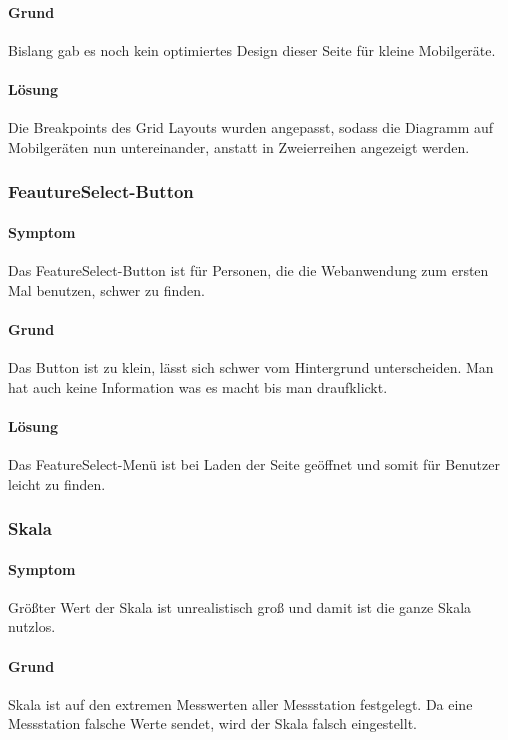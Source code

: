 \paragraph{Grund}
Bislang gab es noch kein optimiertes Design dieser Seite für kleine Mobilgeräte.

\paragraph{Lösung}
Die Breakpoints des Grid Layouts wurden angepasst, sodass die Diagramm auf Mobilgeräten nun untereinander, anstatt in Zweierreihen angezeigt werden.

\subsubsection{FeautureSelect-Button}
\paragraph{Symptom}
Das FeatureSelect-Button ist für Personen, die die Webanwendung zum ersten Mal benutzen, schwer zu finden.  

\paragraph{Grund}
Das Button ist zu klein, lässt sich schwer vom Hintergrund unterscheiden. Man hat auch keine Information was es macht bis man draufklickt.

\paragraph{Lösung}
Das FeatureSelect-Menü ist bei Laden der Seite geöffnet und somit für Benutzer leicht zu finden.

\subsubsection{Skala}
\paragraph{Symptom}
Größter Wert der Skala ist unrealistisch groß und damit ist die ganze Skala nutzlos.

\paragraph{Grund}
Skala ist auf den extremen Messwerten aller Messstation festgelegt. 
Da eine Messstation falsche Werte sendet, wird der Skala falsch eingestellt. 

